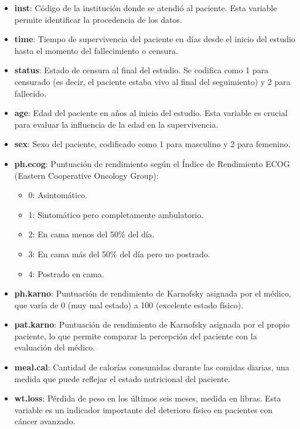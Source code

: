 \documentclass[a4paper,12pt]{article}
\begin{document}
	\begin{itemize}
		\item \textbf{inst}: Código de la institución donde se atendió al paciente. Esta variable permite identificar la procedencia de los datos.
		\item \textbf{time}: Tiempo de supervivencia del paciente en días desde el inicio del estudio hasta el momento del fallecimiento o censura.
		\item \textbf{status}: Estado de censura al final del estudio. Se codifica como 1 para censurado (es decir, el paciente estaba vivo al final del seguimiento) y 2 para fallecido.
		\item \textbf{age}: Edad del paciente en años al inicio del estudio. Esta variable es crucial para evaluar la influencia de la edad en la supervivencia.
		\item \textbf{sex}: Sexo del paciente, codificado como 1 para masculino y 2 para femenino.
		\item \textbf{ph.ecog}: Puntuación de rendimiento según el Índice de Rendimiento ECOG (Eastern Cooperative Oncology Group):
		\begin{itemize}
			\item 0: Asintomático.
			\item 1: Sintomático pero completamente ambulatorio.
			\item 2: En cama menos del 50\% del día.
			\item 3: En cama más del 50\% del día pero no postrado.
			\item 4: Postrado en cama.
		\end{itemize}
		\item \textbf{ph.karno}: Puntuación de rendimiento de Karnofsky asignada por el médico, que varía de 0 (muy mal estado) a 100 (excelente estado físico).
		\item \textbf{pat.karno}: Puntuación de rendimiento de Karnofsky asignada por el propio paciente, lo que permite comparar la percepción del paciente con la evaluación del médico.
		\item \textbf{meal.cal}: Cantidad de calorías consumidas durante las comidas diarias, una medida que puede reflejar el estado nutricional del paciente.
		\item \textbf{wt.loss}: Pérdida de peso en los últimos seis meses, medida en libras. Esta variable es un indicador importante del deterioro físico en pacientes con cáncer avanzado.
	\end{itemize}
	
\end{document}
